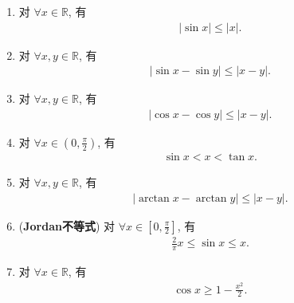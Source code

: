 \documentclass[../../main.tex]{subfiles}%
\begin{document}
\begin{theorem}\label{theorem:三角函数相关初等不等式}
\begin{enumerate}[(1)]
\item\label{theorem:三角函数相关初等不等式-1} 对 $\forall x \in \mathbb{R}$, 有
\begin{align*}
|\sin x| \leqslant |x|.
\end{align*}

\item\label{theorem:三角函数相关初等不等式-2} 对 $\forall x,y \in \mathbb{R}$, 有
\begin{align*}
|\sin x-\sin y|\leqslant |x-y|.
\end{align*}

\item\label{theorem:三角函数相关初等不等式-3} 对 $\forall x,y \in \mathbb{R}$, 有
\begin{align*}
|\cos x-\cos y|\leqslant |x-y|.
\end{align*}

\item\label{theorem:三角函数相关初等不等式-4} 对 $\forall x \in (0,\frac{\pi}{2})$, 有
\begin{align*}
\sin x < x < \tan x.
\end{align*}

\item\label{theorem:三角函数相关初等不等式-5} 对 $\forall x,y \in \mathbb{R}$, 有
\begin{align*}
|\arctan x-\arctan y|\leqslant |x-y|.
\end{align*}

\item\label{theorem:三角函数相关初等不等式-6} (\textbf{Jordan不等式}) 对 $\forall x \in [0,\frac{\pi}{2}]$, 有
\begin{align*}
\frac{2}{\pi}x \leqslant \sin x \leqslant x.
\end{align*}

\item\label{theorem:三角函数相关初等不等式-7} 对 $\forall x \in \mathbb{R}$, 有
\begin{align*}
\cos x \geqslant 1 - \frac{x^2}{2}.
\end{align*}
\end{enumerate}
\end{theorem}
\end{document}
